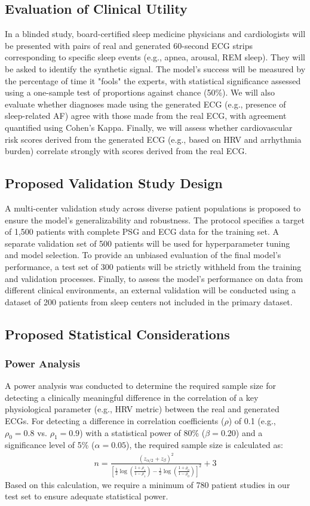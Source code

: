 \documentclass[10pt, conference]{IEEEtran}
\begin{document}
\subsection{Evaluation of Clinical Utility}
In a blinded study, board-certified sleep medicine physicians and cardiologists will be presented with pairs of real and generated 60-second ECG strips corresponding to specific sleep events (e.g., apnea, arousal, REM sleep). They will be asked to identify the synthetic signal. The model's success will be measured by the percentage of time it "fools" the experts, with statistical significance assessed using a one-sample test of proportions against chance (50\%). We will also evaluate whether diagnoses made using the generated ECG (e.g., presence of sleep-related AF) agree with those made from the real ECG, with agreement quantified using Cohen's Kappa. Finally, we will assess whether cardiovascular risk scores derived from the generated ECG (e.g., based on HRV and arrhythmia burden) correlate strongly with scores derived from the real ECG.

\subsection{Proposed Validation Study Design}
A multi-center validation study across diverse patient populations is proposed to ensure the model's generalizability and robustness. The protocol specifies a target of 1,500 patients with complete PSG and ECG data for the training set. A separate validation set of 500 patients will be used for hyperparameter tuning and model selection. To provide an unbiased evaluation of the final model's performance, a test set of 300 patients will be strictly withheld from the training and validation processes. Finally, to assess the model's performance on data from different clinical environments, an external validation will be conducted using a dataset of 200 patients from sleep centers not included in the primary dataset.

\subsection{Proposed Statistical Considerations}

\subsubsection{Power Analysis}
A power analysis was conducted to determine the required sample size for detecting a clinically meaningful difference in the correlation of a key physiological parameter (e.g., HRV metric) between the real and generated ECGs. For detecting a difference in correlation coefficients ($\rho$) of 0.1 (e.g., $\rho_0=0.8$ vs. $\rho_1=0.9$) with a statistical power of 80\% ($\beta = 0.20$) and a significance level of 5\% ($\alpha = 0.05$), the required sample size is calculated as:
\begin{align}
n = \frac{(z_{\alpha/2} + z_\beta)^2}{[\frac{1}{2}\log(\frac{1+\rho_1}{1-\rho_1}) - \frac{1}{2}\log(\frac{1+\rho_0}{1-\rho_0})]^2} + 3
\end{align}
Based on this calculation, we require a minimum of 780 patient studies in our test set to ensure adequate statistical power.
\end{document}
